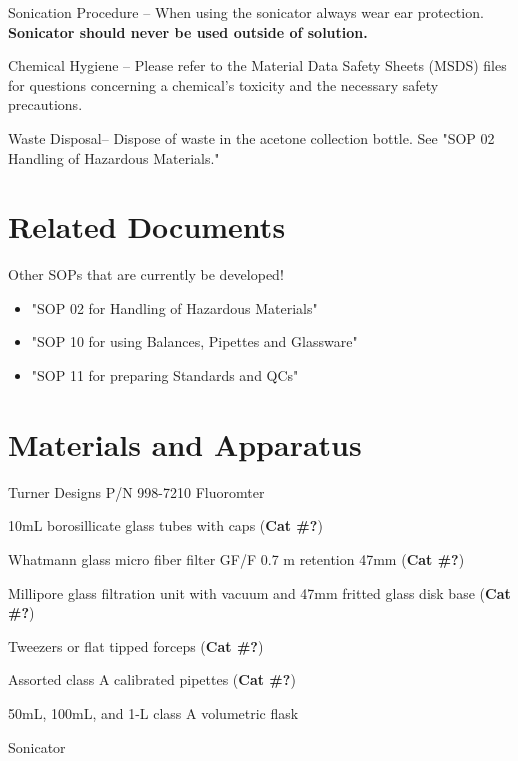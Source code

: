 \documentclass[12pt]{../SOP2}
\begin{document}
\NP Sonication Procedure -- When using the sonicator always wear ear protection. \textbf {Sonicator should never be used outside of solution.}

\NP Chemical Hygiene -- Please refer to the Material Data Safety Sheets (MSDS) files for questions concerning a chemical's toxicity and the necessary safety precautions.

\NP Waste Disposal-- Dispose of waste in the acetone collection bottle. See "SOP 02 Handling of Hazardous Materials." %

\section{Related Documents}

Other SOPs that are currently be developed!

\begin{itemize}

\item "SOP 02 for Handling of Hazardous Materials"
\item "SOP 10 for using Balances, Pipettes and Glassware"
\item "SOP 11 for preparing Standards and QCs" %
\end{itemize}

\section{Materials and Apparatus}
\NP Turner Designs P/N 998-7210 Fluoromter

\NP 10mL borosillicate glass tubes with caps (\textbf{Cat \#?})

\NP Whatmann glass micro fiber filter GF/F 0.7 \micro m retention 47mm (\textbf{Cat \#?})

\NP Millipore glass filtration unit with vacuum and 47mm fritted glass disk base (\textbf{Cat \#?})

\NP Tweezers or flat tipped forceps (\textbf{Cat \#?})

\NP Assorted class A calibrated pipettes (\textbf{Cat \#?})

\NP 50mL, 100mL, and 1-L class A volumetric flask

\NP Sonicator %
\end{document}
